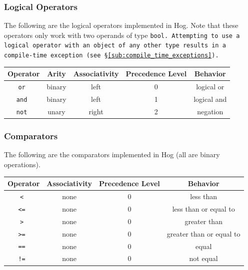 \documentclass{report}
\begin{document}
\subsubsection{Logical Operators} %
\label{ssub:logical_operators}

The following are the logical operators implemented in Hog. Note that these
operators only work with two operands of type \tt bool\rm. Attempting to use a
logical operator with an object of any other type results in a compile-time
exception (see \S \ref{sub:compile_time_exceptions}).

\begin{center}
\begin{tabular}{|c|c|c|c|c|}

\hline \textbf{Operator} & \textbf{Arity} & \textbf{Associativity} &
\textbf{Precedence Level} & \textbf{Behavior} \\ \hline
\tt or \rm & binary & left & 0 & logical or \\ \hline
\tt and \rm & binary & left & 1 & logical and \\ \hline
\tt not \rm & unary & right & 2 & negation \\ \hline
\end{tabular}
\end{center}


\subsubsection{Comparators} %
\label{ssub:comparators}

The following are the comparators implemented in Hog (all are binary operations).

\begin{center}
\begin{tabular}{|c|c|c|c|}

\hline \textbf{Operator} & \textbf{Associativity} &
\textbf{Precedence Level} & \textbf{Behavior} \\ \hline
\tt < \rm & none & 0 & less than \\ \hline
\tt <= \rm & none & 0 & less than or equal to \\ \hline
\tt > \rm & none & 0 & greater than \\ \hline
\tt >= \rm & none & 0 & greater than or equal to \\ \hline
\tt == \rm & none & 0 & equal \\ \hline
\tt != \rm & none & 0 & not equal \\ \hline

\end{tabular}
\end{center}
\end{document}
